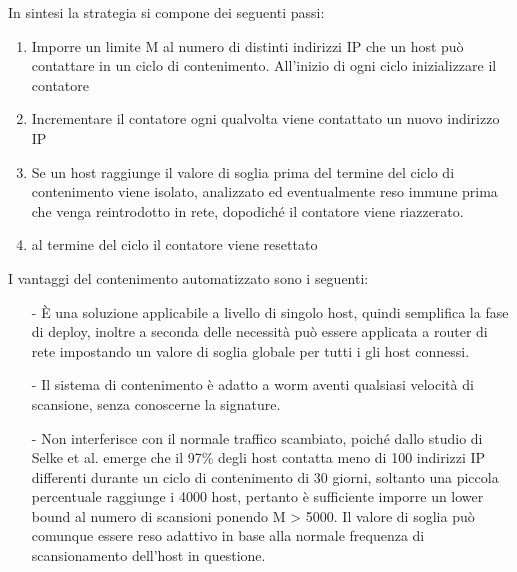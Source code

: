 In sintesi la strategia si compone dei seguenti passi:
\begin{enumerate}
\item Imporre un limite M al numero di distinti indirizzi IP che un host può contattare in un ciclo di contenimento. All’inizio di ogni ciclo inizializzare il contatore
\item Incrementare il contatore ogni qualvolta viene contattato un nuovo indirizzo IP
\item Se un host raggiunge il valore di soglia prima del termine del ciclo di contenimento viene isolato, analizzato ed eventualmente reso immune prima che venga reintrodotto in rete, dopodiché il contatore viene riazzerato.
\item al termine del ciclo il contatore viene resettato
\end{enumerate}
I vantaggi del contenimento automatizzato sono i seguenti:
\begin{itemize}
\item[-] È una soluzione applicabile a livello di singolo host, quindi semplifica la fase di deploy, inoltre a seconda delle necessità può essere applicata a router di rete impostando un valore di soglia globale per tutti i gli host connessi.
\item[-] Il sistema di contenimento è adatto a worm aventi qualsiasi velocità di scansione, senza conoscerne la signature.
\item[-] Non interferisce con il normale traffico scambiato, poiché dallo studio di Selke et al. emerge che il 97\% degli host contatta meno di 100 indirizzi IP differenti durante un ciclo di contenimento di 30 giorni, soltanto una piccola percentuale raggiunge i 4000 host, pertanto è sufficiente imporre un lower bound al numero di scansioni ponendo M > 5000. Il valore di soglia può comunque essere reso adattivo in base alla normale frequenza di scansionamento dell’host in questione.
\end{itemize}
